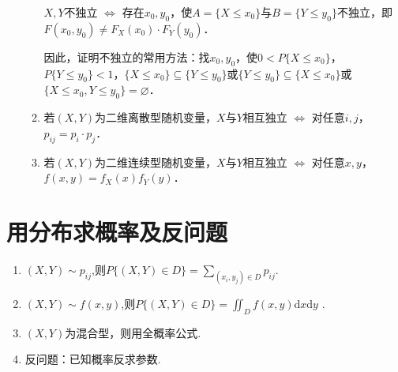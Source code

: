 \begin{enumerate}
\begin{enumerate}
                    $X,Y$不独立 $\Leftrightarrow$ 存在$x_0,y_0$，使$A=\{X\leqslant x_0\}$与$B=\{Y\leqslant y_0\}$不独立，即$F(x_0,y_0)\neq F_X(x_0)\cdot F_Y(y_0)$．

                    因此，证明不独立的常用方法：找$x_0,y_0$，使$0<P\{X\leqslant x_0\}$，$P\{Y\leqslant y_0\}<1$，$\{X\leqslant x_0\}\subseteq\{Y\leqslant y_0\}$或$\{Y\leqslant y_0\}\subseteq\{X\leqslant x_0\}$或$\{X\leqslant x_0,Y\leqslant y_0\}=\varnothing$．
              \item 若$(X,Y)$为二维离散型随机变量，$X$与$Y$相互独立 $\Leftrightarrow$ 对任意$i,j$，$p_{ij}=p_i\cdot p_j$．
              \item 若$(X,Y)$为二维连续型随机变量，$X$与$Y$相互独立 $\Leftrightarrow$ 对任意$x,y$，$f(x,y)=f_X(x)f_Y(y)$．
          \end{enumerate}
\end{enumerate}

\section{用分布求概率及反问题}
\begin{enumerate}
    \item $(X,Y)\sim p_{ij}$,则$P\{ ( X, Y) \in D\} = \sum_{( x_{i}, y_{j}) \in D}p_{ij}$.
    \item $(X,Y)\sim f(x,y)$,则$P\{(X,Y)\in D\}=\iint_{D}f(x,y)$d$x$d$y$ .
    \item $(X,Y)$为混合型，则用全概率公式.
    \item 反问题：已知概率反求参数.
\end{enumerate}